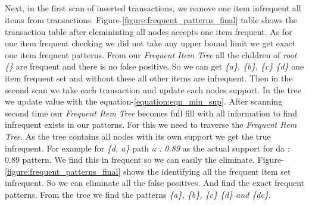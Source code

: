 \subsection*{}
Next, in the first scan of inserted transactions, we remove one item infrequent all items from transactions. Figure-\ref{figure:frequent_patterns_final} table shows the transaction table after elemininting all nodes accepts one item frequent. As for one item frequent checking we did not take any upper bound limit we get exact one item frequent patterns. From our \emph{Frequent Item Tree} all the children of \emph{root \{\}} are frequent and there is no false positive. So we can get \emph{\{a\}, \{b\}, \{c\} \{d\}} one item frequent set and without these all other items are infrequent.  Then in the second scan we take each transaction and update each nodes support. In the tree we update value with the equation-\ref{equation:eqn_min_sup}. After scanning second time our \emph{Frequent Item Tree} becomes full fill with all information to find infrequent exists in our patterns. For this we need to traverse the \emph{Frequent Item Tree}. As the tree contains all nodes with its own support we get the true infrequent. For example for \emph{\{d, a\}} path \emph{a : 0.89} as the actual support for {da : 0.89} pattern. We find this in frequent so we can easily the eliminate. Figure-\ref{figure:frequent_patterns_final} shows the identifying all the frequent item set infrequent. So we can eliminate all the false positives.	And find the exact frequent patterns. From the tree we find the patterns \emph{\{a\}, \{b\}, \{c\} \{d\} and \{dc\}}.

%